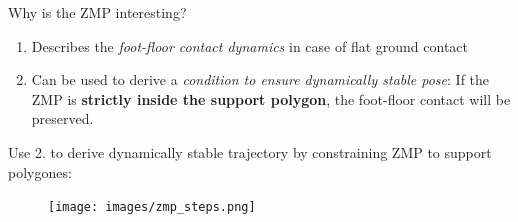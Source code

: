 \begin{frame}{Why is the ZMP interesting?}

\begin{enumerate}
\def\labelenumi{\arabic{enumi}.}
\item
  Describes the \emph{foot-floor contact dynamics} in case of flat
  ground contact
\item
  Can be used to derive a \emph{condition to ensure dynamically stable
  pose}: If the ZMP is \textbf{strictly inside the support polygon}, the
  foot-floor contact will be preserved.
\end{enumerate}

Use 2. to derive dynamically stable trajectory by constraining ZMP to
support polygones:

\begin{figure}[b]
\texttt{[image: images/zmp\_steps.png]}
\end{figure}

\end{frame}

